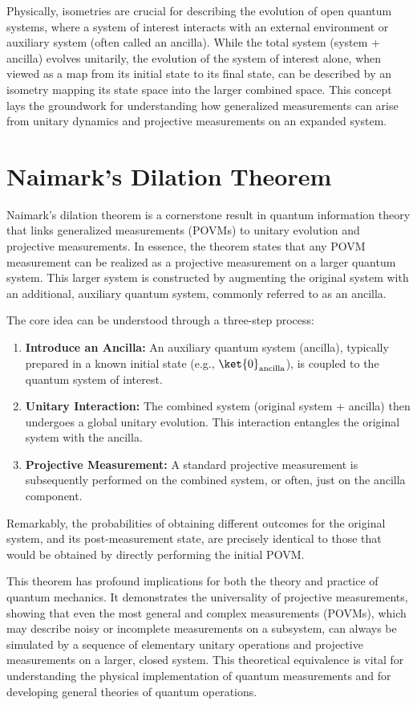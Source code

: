 Physically, isometries are crucial for describing the evolution of open quantum systems,
where a system of interest interacts with an external environment or auxiliary
system (often called an ancilla).
While the total system (system + ancilla) evolves unitarily, the evolution of
the system of interest alone, when viewed as a map from its initial state to
its final state, can be described by an isometry mapping its state space into
the larger combined space.
This concept lays the groundwork for understanding how generalized measurements
can arise from unitary dynamics and projective measurements on an expanded system.


\section{Naimark's Dilation Theorem}
\label{sec:naimark}
Naimark's dilation theorem is a cornerstone result in quantum information
theory that links generalized measurements (POVMs) to unitary evolution and projective measurements.
In essence, the theorem states that any POVM measurement can be realized as a projective measurement on a larger quantum system.
This larger system is constructed by augmenting the original system with an
additional, auxiliary quantum system, commonly referred to as an ancilla.

The core idea can be understood through a three-step process:
\begin{enumerate}
    \item \textbf{Introduce an Ancilla:} An auxiliary quantum system (ancilla), typically prepared in a known initial state (e.g., $\ket{0}_{\text{ancilla}}$), is coupled to the quantum system of interest.
    \item \textbf{Unitary Interaction:} The combined system (original system + ancilla) then undergoes a global unitary evolution. This interaction entangles the original system with the ancilla.
    \item \textbf{Projective Measurement:} A standard projective measurement is subsequently performed on the combined system, or often, just on the ancilla component.
\end{enumerate}
Remarkably, the probabilities of obtaining different outcomes for the original system, and its post-measurement state, are precisely identical to those that would be obtained by directly performing the initial POVM.

This theorem has profound implications for both the theory and practice of quantum mechanics.
It demonstrates the universality of projective measurements, showing that even
the most general and complex measurements (POVMs), which may describe noisy or
incomplete measurements on a subsystem, can always be simulated by a sequence
of elementary unitary operations and projective measurements on a larger, closed system.
This theoretical equivalence is vital for understanding the physical
implementation of quantum measurements and for developing general theories of
quantum operations.

